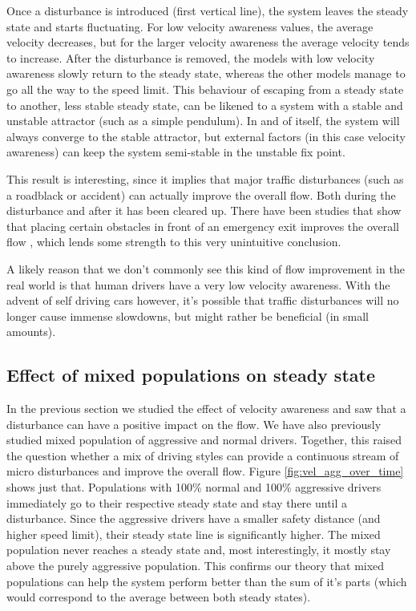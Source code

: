 \documentclass[11pt,a4paper,twocolumn]{article}
\begin{document}
Once a disturbance is introduced (first vertical line), the system leaves the steady state and starts fluctuating. For low velocity awareness values, the average velocity decreases, but for the larger velocity awareness the average velocity tends to increase.
After the disturbance is removed, the models with low velocity awareness slowly return to the steady state, whereas the other models manage to go all the way to the speed limit. This behaviour of escaping from a steady state to another, less stable steady state, can be likened to a system with a stable and unstable attractor (such as a simple pendulum). In and of itself, the system will always converge to the stable attractor, but external factors (in this case velocity awareness) can keep the system semi-stable in the unstable fix point.

This result is interesting, since it implies that major traffic disturbances (such as a roadblack or accident) can actually improve the overall flow. Both during the disturbance and after it has been cleared up.
There have been studies that show that placing certain obstacles in front of an emergency exit improves the overall flow \cite{yanagisawa2009obstacle}, which lends some strength to this very unintuitive conclusion.

A likely reason that we don't commonly see this kind of flow improvement in the real world is that human drivers have a very low velocity awareness. With the advent of self driving cars however, it's possible that traffic disturbances  will no longer cause immense slowdowns, but might rather be beneficial (in small amounts).

\subsection{Effect of mixed populations on steady state}
In the previous section we studied the effect of velocity awareness and saw that a disturbance can have a positive impact on the flow. We have also previously studied mixed population of aggressive and normal drivers. Together, this raised the question whether a mix of driving styles can provide a continuous stream of micro disturbances and improve the overall flow. Figure \ref{fig:vel_agg_over_time} shows just that.
Populations with 100\% normal and 100\% aggressive drivers immediately go to their respective steady state and stay there until a disturbance. Since the aggressive drivers have a smaller safety distance (and higher speed limit), their steady state line is significantly higher. The mixed population never reaches a steady state and, most interestingly, it mostly stay above the purely aggressive population. This confirms our theory that mixed populations can help the system perform better than the sum of it's parts (which would correspond to the average between both steady states).
\end{document}
